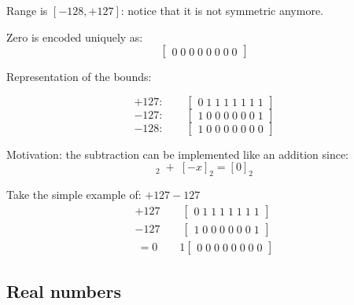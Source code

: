 \documentclass{article}
\begin{document}
Range is $[-128, +127]$:  notice that it is not symmetric anymore.

Zero is encoded uniquely as:
\begin{equation*}
\begin{bmatrix}0\;0\;0\;0\;0\;0\;0\;0 \end{bmatrix}
\end{equation*}

Representation of the bounds:

\begin{equation*}
+127:\qquad\begin{bmatrix}0\;1\;1\;1\;1\;1\;1\;1 \end{bmatrix}
\end{equation*}
\begin{equation*}
-127:\qquad\begin{bmatrix}1\;0\;0\;0\;0\;0\;0\;1 \end{bmatrix}
\end{equation*}
\begin{equation*}
-128:\qquad\begin{bmatrix}1\;0\;0\;0\;0\;0\;0\;0 \end{bmatrix}
\end{equation*}

Motivation: the subtraction can be implemented like an addition since:
\begin{equation*}
[+x]_2\;+\;[-x]_2 = [0]_2
\end{equation*}

Take the simple example of: $+ 127 - 127$
\begin{equation*}
\begin{split}
+127\qquad\begin{bmatrix}0\;1\;1\;1\;1\;1\;1\;1 \end{bmatrix}\\
-127\qquad\begin{bmatrix}1\;0\;0\;0\;0\;0\;0\;1 \end{bmatrix}\\
\ = 0 \qquad 1 \begin{bmatrix}0\;0\;0\;0\;0\;0\;0\;0 \end{bmatrix}
\end{split}
\end{equation*}

\subsection{Real numbers}
\end{document}
